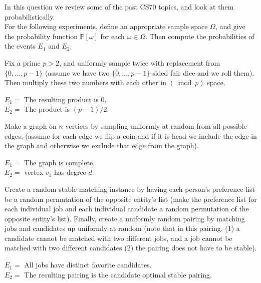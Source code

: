 \documentclass[11pt]{article}
\begin{document}
In this question we review some of the past CS70 topics, and look at them probabilistically.\\
For the following experiments, define an appropriate sample space $\Omega$, and give the probability function $\mathbb P[\omega]$ for each $\omega \in \Omega$. Then compute the probabilities of the events $E_1$ and $E_2$.\\

\begin{Parts}
    \Part Fix a prime $p>2$, and uniformly sample twice with replacement from
    $\{0, \dots, p-1\}$ (assume we have two $\{0, \dots, p-1\}$-sided fair dice and we roll them). Then multiply these two numbers with each other in
    $(\bmod{p})$ space.\\
    \begin{center}
    $E_1 =$ The resulting product is $0$.\\
    $E_2 =$ The product is $(p-1)/2$.
    \end{center}

    \Part Make a graph on $n$ vertices by sampling uniformly at random from all possible edges, (assume for each edge we flip a coin and if it is head we include the edge in the graph and otherwise we exclude that edge from the graph).\\
    \begin{center}
    $E_1 =$ The graph is complete.\\
    $E_2 =$ vertex $v_1$ has degree $d$.
    \end{center}

    \Part Create a random stable matching instance by having each person's
    preference list be a random permutation of the opposite entity's list (make the preference list for each individual job and each individual candidate a random permutation of the opposite entity's list). Finally, create a uniformly random pairing by matching jobs and candidates up uniformly at random (note that in this pairing, (1) a candidate cannot be matched with two different jobs, and a job cannot be matched with two different candidates (2) the pairing does not have to be stable).\\
    \begin{center}
     $E_1 =$ All jobs have distinct favorite candidates.\\
     $E_2 =$ The resulting pairing is the candidate optimal stable pairing.
    \end{center}

\end{Parts}
\end{document}
